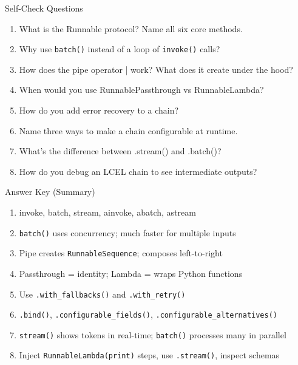 \documentclass[aspectratio=169,11pt]{beamer}
\begin{document}
\begin{frame}{Self-Check Questions}
  \begin{enumerate}\setlength{\itemsep}{1pt}
    \item What is the Runnable protocol? Name all six core methods.
    \vspace{0.12em}
    \item Why use \texttt{batch()} instead of a loop of \texttt{invoke()} calls?
    \vspace{0.12em}
    \item How does the pipe operator | work? What does it create under the hood?
    \vspace{0.12em}
    \item When would you use RunnablePassthrough vs RunnableLambda?
    \vspace{0.12em}
    \item How do you add error recovery to a chain?
    \vspace{0.12em}
    \item Name three ways to make a chain configurable at runtime.
    \vspace{0.12em}
    \item What's the difference between .stream() and .batch()?
    \vspace{0.12em}
    \item How do you debug an LCEL chain to see intermediate outputs?
  \end{enumerate}
\end{frame}

\begin{frame}{Answer Key (Summary)}
  \begin{enumerate}\setlength{\itemsep}{1pt}
    \item invoke, batch, stream, ainvoke, abatch, astream
    \item \texttt{batch()} uses concurrency; much faster for multiple inputs
    \item Pipe creates \texttt{RunnableSequence}; composes left-to-right
    \item Passthrough = identity; Lambda = wraps Python functions
    \item Use \texttt{.with\_fallbacks()} and \texttt{.with\_retry()}
    \item \texttt{.bind()}, \texttt{.configurable\_fields()}, \texttt{.configurable\_alternatives()}
    \item \texttt{stream()} shows tokens in real-time; \texttt{batch()} processes many in parallel
    \item Inject \texttt{RunnableLambda(print)} steps, use \texttt{.stream()}, inspect schemas
  \end{enumerate}
\end{frame}
\end{document}
